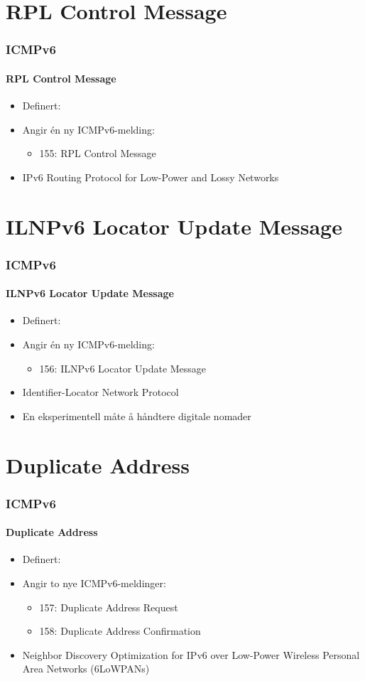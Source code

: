 \section{RPL Control Message}
\begin{frame}
  \frametitle{ICMPv6}
  \framesubtitle{RPL Control Message}
  \begin{itemize}
  \item Definert: 
  \item Angir én ny ICMPv6-melding:
    \begin{itemize}
    \item 155: RPL Control Message
    \end{itemize}
  \item IPv6 Routing Protocol for Low-Power and Lossy Networks
  \end{itemize}
\end{frame}

\section{ILNPv6 Locator Update Message}
\begin{frame}
  \frametitle{ICMPv6}
  \framesubtitle{ILNPv6 Locator Update Message}
  \begin{itemize}
  \item Definert: 
  \item Angir én ny ICMPv6-melding:
    \begin{itemize}
    \item 156: ILNPv6 Locator Update Message
    \end{itemize}
  \item Identifier-Locator Network Protocol
  \item En eksperimentell måte å håndtere digitale nomader
  \end{itemize}
\end{frame}

\section{Duplicate Address}
\begin{frame}
  \frametitle{ICMPv6}
  \framesubtitle{Duplicate Address}
  \begin{itemize}
  \item Definert: 
  \item Angir to nye ICMPv6-meldinger:
    \begin{itemize}
    \item 157: Duplicate Address Request
    \item 158: Duplicate Address Confirmation
    \end{itemize}
  \item Neighbor Discovery Optimization for IPv6 over Low-Power
    Wireless Personal Area Networks (6LoWPANs)
  \end{itemize}
\end{frame}

